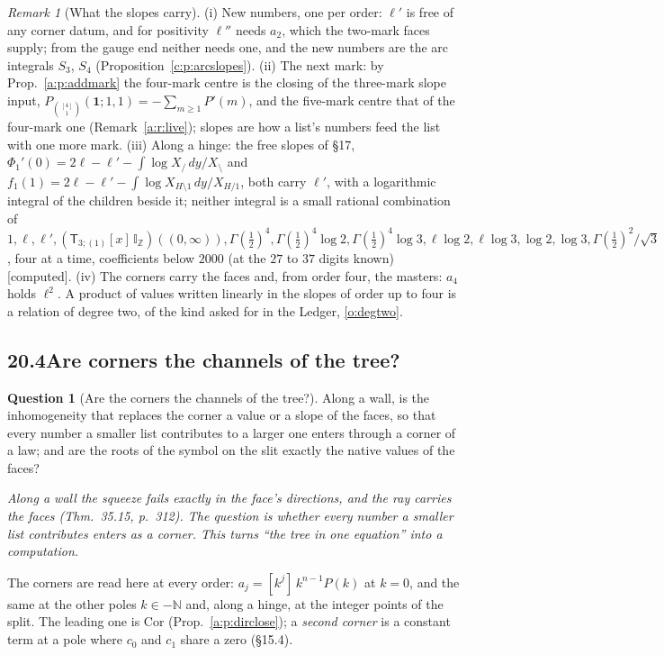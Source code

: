 \documentclass[11pt]{article}
\newcommand{\one}{\mathbf 1}
\newcommand{\sT}{\mathsf T}
\newcommand{\IZ}{\mathbb I_{\mathbb Z}}
\newcommand{\Tx}[3]{(\sT_{#1;(1)}[x]\,#2)((#3,\infty))}
\newcommand{\Pfour}{P_{\binom{[4]}1}(\one;1,1)}
\theoremstyle{plain}
\theoremstyle{definition}
\newtheorem{question}[proposition]{Question}
\theoremstyle{remark}
\newtheorem{remark}[proposition]{Remark}
\newcommand{\computed}{\textup{[computed]}}
\begin{document}
\begin{remark}[What the slopes carry]\label{b:r:slopes}
(i) New numbers, one per order: $\ell'$ is free of any corner datum, and for positivity $\ell''$ needs $a_2$, which the two-mark faces supply; from the gauge end neither needs one, and the new numbers are the arc integrals $S_3$, $S_4$ (Proposition~\ref{c:p:arcslopes}). (ii) The next mark: by Prop.~\ref{a:p:addmark} the four-mark centre is the closing of the three-mark slope input, $\Pfour=-\sum_{m\ge1}P'(m)$, and the five-mark centre that of the four-mark one (Remark~\ref{a:r:live}); slopes are how a list's numbers feed the list with one more mark. (iii) Along a hinge: the free slopes of \S17, $\Phi_1'(0)=2\ell-\ell'-\int\log X_{/}\,dy/X_{\setminus}$ and $f_1(1)=2\ell-\ell'-\int\log X_{H\setminus1}\,dy/X_{H/1}$, both carry $\ell'$, with a logarithmic integral of the children beside it; neither integral is a small rational combination of $1,\ell,\ell',\Tx3{\IZ}0,\Gamma(\frac12)^4,\Gamma(\frac12)^4\log2,\Gamma(\frac12)^4\log3,\ell\log2,\ell\log3,\log2,\log3,\Gamma(\frac12)^2/\sqrt3$, four at a time, coefficients below $2000$ (at the $27$ to $37$ digits known) \computed. (iv) The corners carry the faces and, from order four, the masters: $a_4$ holds $\ell^2$. A product of values written linearly in the slopes of order up to four is a relation of degree two, of the kind asked for in the Ledger, \ref{o:degtwo}.
\end{remark}

\subsection*{20.4\quad Are corners the channels of the tree?}

\begin{question}[Are the corners the channels of the tree?]\label{a:q:channels}
Along a wall, is the inhomogeneity that replaces the corner a value or a slope of the faces, so that every number a smaller list contributes to a larger one enters through a corner of a law; and are the roots of the symbol on the slit exactly the native values of the faces?
\end{question}

\emph{Along a wall the squeeze fails exactly in the face's directions, and the ray carries the faces (Thm.~35.15, p.~312). The question is whether every number a smaller list contributes enters as a corner. This turns ``the tree in one equation'' into a computation.}

The corners are read here at every order: $a_j=[k^j]\,k^{n-1}P(k)$ at $k=0$, and the same at the other poles $k\in-\mathbb N$ and, along a hinge, at the integer points of the split. The leading one is $\mathrm{Cor}$ (Prop.~\ref{a:p:dirclose}); a \emph{second corner} is a constant term at a pole where $c_0$ and $c_1$ share a zero (\S15.4).
\end{document}
